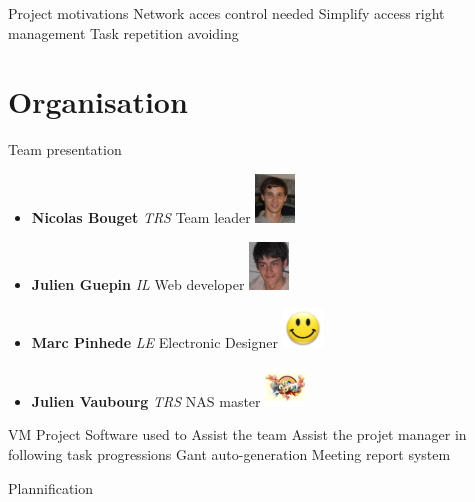 \documentclass[12pt]{beamer}
\begin{document}
\begin{frame}{Project motivations}
    Network acces control needed
    \vfill
    Simplify access right management
    \vfill
    Task repetition avoiding

\end{frame}
    

\section{Organisation}

\begin{frame}{Team presentation}
    \begin{itemize}
	\item {\bf Nicolas Bouget} \emph{TRS} Team leader \hfill \includegraphics[width=30pt]{img/bouget.jpg}\\
	\vfill
	\item {\bf Julien Guepin} \emph{IL} Web developer \hfill \includegraphics[width=30pt]{img/guepin.jpg}
	\vfill
	\item {\bf Marc Pinhede} \emph{LE} Electronic Designer \hfill \includegraphics[width=30pt]{img/pinhede.jpg}
	\vfill
	\item {\bf Julien Vaubourg} \emph{TRS} NAS master \hfill \includegraphics[width=30pt]{img/vaubourg.jpg}
    \end{itemize}
\end{frame}


\begin{frame}{VM Project}
    Software used to Assist the team
    \vfill
    Assist the projet manager in following task progressions
    \vfill
    Gant auto-generation
    \vfill
    Meeting report system
\end{frame}

\begin{frame}{Plannification}
\end{frame}
    
\end{document}
